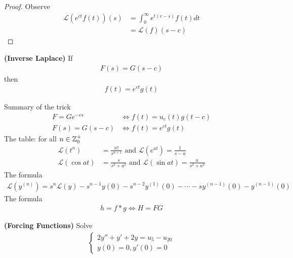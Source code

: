 \documentclass{report}
\begin{document}
\begin{proof}
Observe
\begin{align*}
\mathcal{L}(e^{ct}f(t))(s)&= \int_0^{\infty} e^{t(c-s)}f(t)dt\\
&=\mathcal{L}(f)(s-c)
\end{align*}
\end{proof}
\begin{corollary}
\textbf{(Inverse Laplace)} If 
\begin{align*}
F(s)=G(s-c)
\end{align*}
then 
\begin{align*}
f(t)=e^{ct}g(t)
\end{align*}
\end{corollary}
\begin{mdframed}
Summary of the trick 
\begin{align*}
  F=Ge^{-cs} &\iff  f(t)=u_c(t)g(t-c)\\
  F(s)=G(s-c) &\iff  f(t)=e^{ct}g(t) 
\end{align*}
The table: for all $n \in\mathbb{Z}_0^+$
\begin{align*}
\mathcal{L}(t^n)&= \frac{n!}{s^{n+1}}\text{ and }\mathcal{L}(e^{at})= \frac{1}{s-a}\\
\mathcal{L}(\cos at)&= \frac{s}{s^2+a^2} \text{ and }\mathcal{L}(\sin at)= \frac{a}{s^2+a^2}
\end{align*}
The formula 
\begin{align*}
\mathcal{L}(y^{(n)})=s^n \mathcal{L}(y) - s^{n-1}y(0) - s^{n-2}y^{(1)}(0) - \cdots - s y ^{(n-1)}(0) - y^{(n-1)}(0)
\end{align*}
The formula 
\begin{align*}
h=f * g \iff H= FG
\end{align*}
\end{mdframed}
\begin{theorem}
\textbf{(Forcing Functions)} Solve 
\begin{align*}
\begin{cases}
 2y''+y'+2y= u_5-u_{20} \\
 y(0)=0,y'(0)=0
\end{cases}
\end{align*}
\end{theorem}
\end{document}
